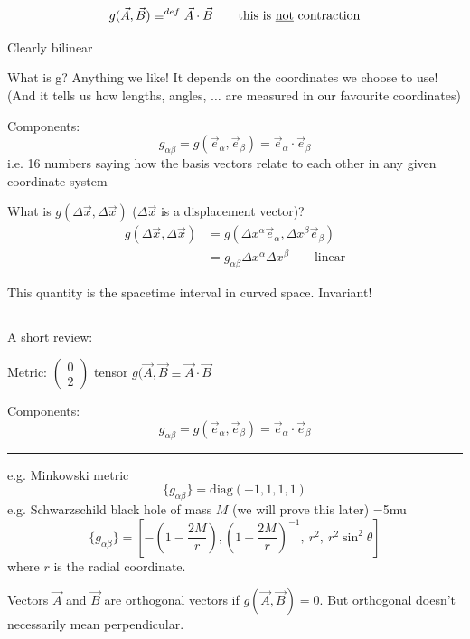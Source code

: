 \documentclass[a4paper]{article} %
\newcommand{\review}[1]
{
\hrule
A short review:

#1
\hrule
}
\newcommand{\pmx}[1]{
\begin{pmatrix}
#1
\end{pmatrix}
}
\begin{document}
\begin{equation}
g(\vec{A},\vec{B})\equiv^{def}\vec{A}\cdot \vec{B}\qquad\text{this is \underline{not} contraction}
\end{equation}

Clearly bilinear

What is g? Anything we like! It depends on the coordinates we choose to use! (And it tells us how lengths, angles, $\ldots$ are measured in our favourite coordinates)

Components: 
\begin{equation}
g_{\alpha\beta}=g(\vec{e}_{\alpha},\vec{e}_{\beta})=\vec{e}_{\alpha}\cdot \vec{e}_{\beta}
\end{equation}
i.e. 16 numbers saying how the basis vectors relate to each other in any given coordinate system

What is $g(\Delta\vec{x},\Delta\vec{x})$ ($\Delta\vec{x}$ is a displacement vector)?
\begin{align*}
g(\Delta\vec{x},\Delta\vec{x})&=g(\Delta x^{\alpha}\vec{e}_{\alpha},\Delta x^{\beta}\vec{e}_{\beta})\\
&=g_{\alpha\beta}\Delta x^{\alpha}\Delta x^{\beta} \qquad\text{linear}
\end{align*}

This quantity is the spacetime interval in curved space. Invariant!

\review{Metric: $\pmx{0\\2}$ tensor $g(\vec{A},\vec{B}\equiv \vec{A}\cdot\vec{B}$

Components: 
\begin{equation}
g_{\alpha\beta}=g(\vec{e}_{\alpha},\vec{e}_{\beta})=\vec{e}_{\alpha}\cdot \vec{e}_{\beta}
\end{equation}
}

e.g. Minkowski metric
\begin{equation}
\{g_{\alpha\beta}\}=\text{diag}(-1,1,1,1)
\end{equation}
e.g. Schwarzschild black hole of mass $M$ (we will prove this later)
\thinmuskip=5mu
\begin{equation}
\{g_{\alpha\beta}\}=\left[-\left(1-\frac{2M}{r}\right),\left(1-\frac{2M}{r}\right)^{-1},~r^2,~r^2\sin^2\theta\right]
\end{equation}
where $r$ is the radial coordinate.

Vectors $\vec{A}$ and $\vec{B}$ are orthogonal vectors if $g(\vec{A},\vec{B})=0$. But orthogonal doesn't necessarily mean perpendicular.
\end{document}
